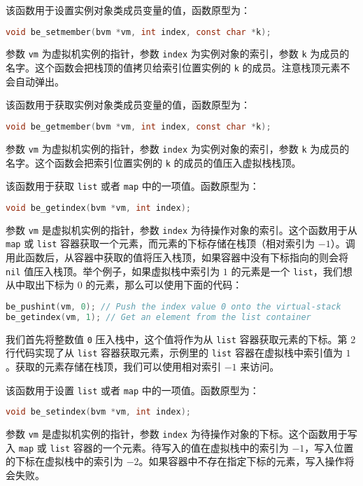 
该函数用于设置实例对象类成员变量的值，函数原型为：
\begin{lstlisting}[language=c, style=berry, numbers=none]
void be_setmember(bvm *vm, int index, const char *k);
\end{lstlisting}
参数 \texttt{vm} 为虚拟机实例的指针，参数 \texttt{index} 为实例对象的索引，参数 \texttt{k} 为成员的名字。这个函数会把栈顶的值拷贝给索引位置实例的 \texttt{k} 的成员。注意栈顶元素不会自动弹出。


该函数用于获取实例对象类成员变量的值，函数原型为：
\begin{lstlisting}[language=c, style=berry, numbers=none]
void be_getmember(bvm *vm, int index, const char *k);
\end{lstlisting}
参数 \texttt{vm} 为虚拟机实例的指针，参数 \texttt{index} 为实例对象的索引，参数 \texttt{k} 为成员的名字。这个函数会把索引位置实例的 \texttt{k} 的成员的值压入虚拟栈栈顶。


该函数用于获取 \texttt{list} 或者 \texttt{map} 中的一项值。函数原型为：
\begin{lstlisting}[language=c, style=berry, numbers=none]
void be_getindex(bvm *vm, int index);
\end{lstlisting}
参数 \texttt{vm} 是虚拟机实例的指针，参数 \texttt{index} 为待操作对象的索引。这个函数用于从 \texttt{map} 或 \texttt{list} 容器获取一个元素，而元素的下标存储在栈顶（相对索引为 $-1$）。调用此函数后，从容器中获取的值将压入栈顶，如果容器中没有下标指向的则会将 \texttt{nil} 值压入栈顶。举个例子，如果虚拟栈中索引为 $1$ 的元素是一个 \texttt{list}，我们想从中取出下标为 $0$ 的元素，那么可以使用下面的代码：

\begin{lstlisting}[language=c, style=berry]
be_pushint(vm, 0); // Push the index value 0 onto the virtual-stack
be_getindex(vm, 1); // Get an element from the list container
\end{lstlisting}
我们首先将整数值 \texttt{0} 压入栈中，这个值将作为从 \texttt{list} 容器获取元素的下标。第 2 行代码实现了从 \texttt{list} 容器获取元素，示例里的 \texttt{list} 容器在虚拟栈中索引值为 $1$。获取的元素存储在栈顶，我们可以使用相对索引 $-1$ 来访问。


该函数用于设置 \texttt{list} 或者 \texttt{map} 中的一项值。函数原型为：
\begin{lstlisting}[language=c, style=berry, numbers=none]
void be_setindex(bvm *vm, int index);
\end{lstlisting}
参数 \texttt{vm} 是虚拟机实例的指针，参数 \texttt{index} 为待操作对象的下标。这个函数用于写入 \texttt{map} 或 \texttt{list} 容器的一个元素。待写入的值在虚拟栈中的索引为 $-1$，写入位置的下标在虚拟栈中的索引为 $-2$。如果容器中不存在指定下标的元素，写入操作将会失败。

